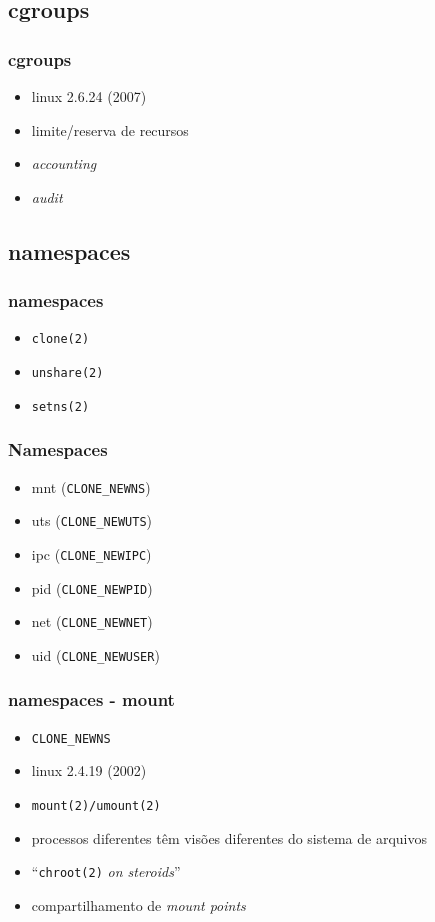 \documentclass{beamer}
\begin{document}
\subsection{cgroups}

\begin{frame}
    \frametitle{cgroups}
    \begin{itemize}
        \item linux 2.6.24 (2007)
        \item limite/reserva de recursos
        \item \textit{accounting}
        \item \textit{audit}
    \end{itemize}
\end{frame}

\subsection{namespaces}

\begin{frame}
    \frametitle{namespaces}
    \begin{itemize}
        \item \texttt{clone(2)}
        \item \texttt{unshare(2)}
        \item \texttt{setns(2)}
    \end{itemize}
\end{frame}

\begin{frame}
    \frametitle{Namespaces}
    \begin{itemize}
        \item mnt (\texttt{CLONE\_NEWNS})
        \item uts (\texttt{CLONE\_NEWUTS})
        \item ipc (\texttt{CLONE\_NEWIPC})
        \item pid (\texttt{CLONE\_NEWPID})
        \item net (\texttt{CLONE\_NEWNET})
        \item uid (\texttt{CLONE\_NEWUSER})
    \end{itemize}
\end{frame}

\begin{frame}
    \frametitle{namespaces - mount}
    \begin{itemize}
        \item \texttt{CLONE\_NEWNS}
        \item linux 2.4.19 (2002)
        \item \texttt{mount(2)/umount(2)}
        \item processos diferentes têm visões diferentes do sistema de arquivos
        \item ``\texttt{chroot(2)} \textit{on steroids}''
        \item compartilhamento de \textit{mount points}
    \end{itemize}
\end{frame}
\end{document}
